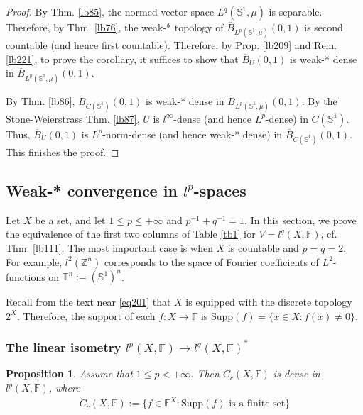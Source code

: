\documentclass[12pt,b5paper,notitlepage]{article}
\theoremstyle{definition}
\theoremstyle{plain}
\newtheorem{pp}[df]{Proposition}
\newcommand{\ovl}{\overline}
\newcommand{\Zbb}{\mathbb Z}
\newcommand{\Sbb}{{\mathbb S}}
\newcommand{\Supp}{\mathrm{Supp}}
\newcommand{\Fbb}{\mathbb F}
\numberwithin{equation}{section}
\begin{document}
\begin{proof}
By Thm. \ref{lb85}, the normed vector space $L^q(\Sbb^1,\mu)$ is separable. Therefore, by Thm. \ref{lb76}, the weak-* topology of $\ovl B_{L^p(\Sbb^1,\mu)}(0,1)$ is second countable (and hence first countable). Therefore, by Prop. \ref{lb209} and Rem. \ref{lb221}, to prove the corollary, it suffices to show that $\ovl B_U(0,1)$ is weak-* dense in $\ovl B_{L^p(\Sbb^1,\mu)}(0,1)$. 

By Thm. \ref{lb86}, $\ovl B_{C(\Sbb^1)}(0,1)$ is weak-* dense in $\ovl B_{L^p(\Sbb^1,\mu)}(0,1)$. By the Stone-Weierstrass Thm. \ref{lb87}, $U$ is $l^\infty$-dense (and hence $L^p$-dense) in $C(\Sbb^1)$. Thus, $\ovl B_U(0,1)$ is $L^p$-norm-dense (and hence weak-* dense) in $\ovl B_{C(\Sbb^1)}(0,1)$. This finishes the proof.
\end{proof}






\subsection{Weak-* convergence in $l^p$-spaces}



Let $X$ be a set, and let $1\leq p\leq+\infty$ and $p^{-1}+q^{-1}=1$. In this section, we prove the equivalence of the first two columns of Table \ref{tb1} for $V=l^q(X,\Fbb)$, cf. Thm. \ref{lb111}. The most important case is when $X$ is countable and $p=q=2$. For example, $l^2(\Zbb^n)$ corresponds to the space of Fourier coefficients of $L^2$-functions on $\mathbb T^n:=(\Sbb^1)^n$.

Recall from the text near \eqref{eq201} that $X$ is equipped with the discrete topology $2^X$. Therefore, the support of each $f:X\rightarrow\Fbb$ is $\Supp(f)=\{x\in X:f(x)\neq0\}$.








\subsubsection{The linear isometry $l^p(X,\Fbb)\rightarrow l^q(X,\Fbb)^*$}

\begin{pp}\label{lb109}
Assume that $1\leq p<+\infty$. Then $C_c(X,\Fbb)$ is dense in $l^p(X,\Fbb)$, where
\begin{align}\label{eq60}
C_c(X,\Fbb):=\{f\in\Fbb^X:\Supp(f)\text{ is a finite set}\}
\end{align}
\end{pp}
\end{document}
